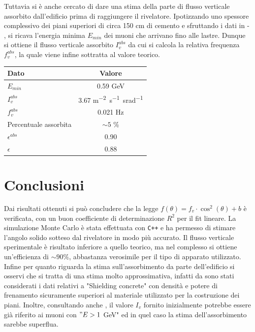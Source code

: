 \documentclass[a4paper,12pt]{article}
\begin{document}
Tuttavia si è anche cercato di dare una stima della parte di flusso verticale assorbito dall'edificio prima di raggiungere il rivelatore. Ipotizzando uno spessore complessivo dei piani superiori di circa 150 \unit{cm} di cemento e sfruttando i dati in \cite{Haino_2004} - \cite{ParticleDataGroup:2026aaa},
 si ricava l'energia minima $E_{min}$ dei muoni che arrivano fino alle lastre. Dunque si ottiene il flusso verticale assorbito $I_v^{abs}$ da cui si calcola la relativa frequenza $f_v^{abs}$, la quale viene infine sottratta al valore teorico.


\begin{table}[H] 
    \centering
    \begin{tabular}{
        l
        c 
    }
        \toprule
        {Dato} & {Valore}\\
        \midrule
        $E_{min}$ & 0.59 \unit{GeV} \\
        $I_v^{abs}$ & 3.67 \unit{m^{-2} s^{-1} srad^{-1}} \\
        $f_v^{abs}$ & 0.021 \unit{Hz} \\
        Percentuale assorbita & $\sim5$ \% \\
        \midrule
        $\epsilon^{abs}$ & 0.90 \\
        $\epsilon$ & 0.88 \\
        \bottomrule
    \end{tabular}

    \label{tab:Efficienza}
\end{table}


\section{Conclusioni}
Dai risultati ottenuti si può concludere che la legge $f(\theta) = f_v \cdot \cos^2(\theta) + b$ è verificata, con un buon coefficiente di determinazione $R^2$ per il fit lineare.
La simulazione Monte Carlo è stata effettuata con \texttt{C++} e ha permesso di stimare l'angolo solido sotteso dal rivelatore in modo più accurato.
Il flusso verticale sperimentale è risultato inferiore a quello teorico, ma nel complesso si ottiene un'efficienza di $\sim90\%$, abbastanza verosimile per il tipo di apparato utilizzato.
Infine per quanto riguarda la stima sull'assorbimento da parte dell'edificio si osservi che si tratta di una stima molto approssimativa, infatti da \cite{ParticleDataGroup:2026aaa} sono stati considerati i dati relativi a "Shielding concrete" con densità e potere di frenamento sicuramente superiori al materiale utilizzato per la costruzione dei piani. 
Inoltre, consultando anche \cite{shukla2018energyangulardistributionsatmospheric}, il valore $I_v$ fornito inizialmente potrebbe essere già riferito ai muoni con $"E>1$ \unit{GeV}" ed in quel caso la stima dell'assorbimento sarebbe superflua.   


\printbibliography
\end{document}
